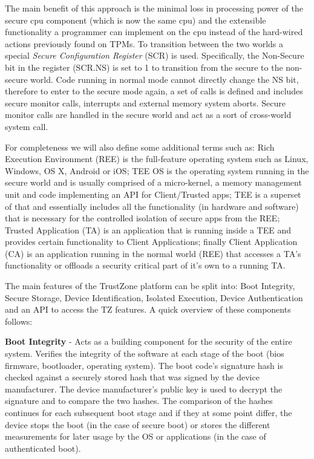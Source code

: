 \documentclass[cameraready]{cseminar}
\begin{document}
The main benefit of this approach is the minimal loss in processing power of the secure cpu component (which is now the same cpu) and the extensible functionality a programmer can implement on the cpu instead of the hard-wired actions previously found on TPMs. To transition between the two worlds a special \textit{Secure Configuration Register} (SCR) is used. Specifically, the Non-Secure bit in the register (SCR.NS) is set to 1 to transition from the secure to the non-secure world. Code running in normal mode cannot directly change the NS bit, therefore to enter to the secure mode again, a set of calls is defined and includes secure monitor calls, interrupts and external memory system aborts. Secure monitor calls are handled in the secure world and act as a sort of cross-world system call.

For completeness we will also define some additional terms such as: Rich Execution Environment (REE) is the full-feature operating system such as Linux, Windows, OS X, Android or iOS; TEE OS is the operating system running in the secure world and is usually comprised of a micro-kernel, a memory management unit and code implementing an API for Client/Trusted apps; TEE is a superset of that and  essentially includes all the functionality (in hardware and software) that is necessary for the controlled isolation of secure apps from the REE; Trusted Application (TA) is an application that is running inside a TEE and provides certain functionality to Client Applications; finally Client Application (CA) is an application running in the normal world (REE) that accesses a TA's functionality or offloads a security critical part of it's own to a running TA.

The main features of the TrustZone platform can be split into: Boot Integrity, Secure Storage, Device Identification, Isolated Execution, Device Authentication and an API to access the TZ features. A quick overview of these components follows:

\textbf{Boot Integrity} - Acts as a building component for the security of the entire system. Verifies the integrity of the software at each stage of the boot (bios firmware, bootloader, operating system). The boot code's signature hash is checked against a securely stored hash that was signed by the device manufacturer. The device manufacturer's public key is used to decrypt the signature and to compare the two hashes. The comparison of the hashes continues for each subsequent boot stage and if they at some point differ, the device stops the boot (in the case of secure boot) or stores the different measurements for later usage by the OS or applications (in the case of authenticated boot). 
\end{document}
